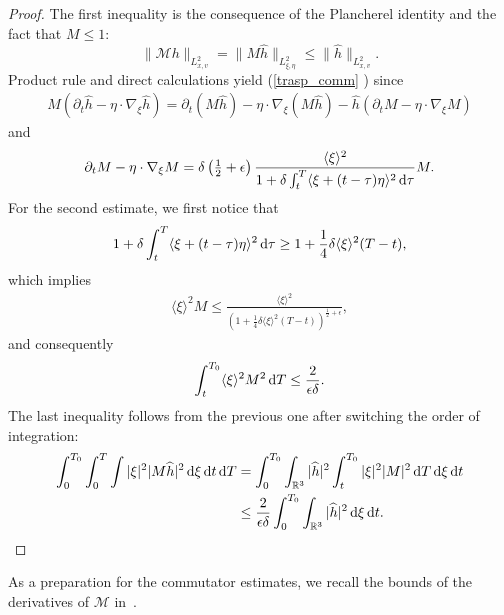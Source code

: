 \documentclass[11pt,american, reqno]{amsart}
\numberwithin{equation}{section}
\newcommand{\R}{\mathbb R}
\newcommand{\1}{\mathds{1}}
\newcommand{\dt}{\, {\rm d} t}
\newcommand{\dT}{\, {\rm d} T}
\newcommand{\CalM}{\mathcal{M}}
\newcommand{\dxi}{\, {\rm d} \xi}
\newcommand{\dtau}{\, {\rm d} \tau}
\newcommand{\Eps}{\epsilon}
\numberwithin{equation}{section}
\begin{document}
\begin{proof} 
The first inequality is the consequence of the Plancherel identity and the fact that $M\le 1$: 
$$
\| \CalM h \|_{L^2_{x,v}} = \| M \hat{h} \|_{L^2_{\xi, \eta}} \le  \| \hat{h} \|_{L^2_{x,v}}. 
$$
Product rule and direct calculations yield (\ref {trasp_comm} ) since 
\begin{align*}
{M} (\partial_t \widehat h   -\eta \cdot \nabla_\xi \widehat  h)  =  \partial_t ({M}\widehat h)  -\eta \cdot \nabla_\xi ({M}\widehat  h)  -\widehat  h( \partial_t {M} -\eta \cdot \nabla_\xi {M})
\end{align*}
and 
\begin{align*}
 \partial_t {M} -\eta \cdot \nabla_\xi {M} = \delta \left(\tfrac{1}{2}+ \Eps\right)\frac{ \langle \xi \rangle^{2}}{1 + \delta \int_t ^T \langle \xi +(t- \tau) \eta\rangle^{2} \dtau} {M}. 
\end{align*}
For the second estimate, we first notice that  
\begin{align*}
 1 + \delta \int_t ^T \langle \xi +(t- \tau) \eta\rangle^{2} \dtau   
\geq  
  1+\frac{1}{4} \delta \langle \xi \rangle ^2 (T-t),
\end{align*}
which implies 
\begin{align*}
 \langle \xi \rangle ^2 {M} 
\le 
  \frac{ \langle \xi \rangle ^2}{ \left( 1+\frac{1}{4} \delta  \langle \xi \rangle ^2 (T-t)\right)^{\frac{1}{2}+\Eps}}, 
\end{align*}
and consequently 
\begin{align*}
 \int_t^{T_0}  \langle \xi \rangle ^2 {M}^2 \dT 
\le   
 \frac{2}{\Eps \delta}. 
\end{align*}
The last inequality follows from the previous one after switching the order of integration:
\begin{align*}
\int_0^{T_0}  \int_0^{T}  \int  |\xi|^2 | {M}\widehat h| ^2 \dxi  \dt \dT & = \int_0^{T_0} \int_{\R^3} |\widehat{h}| ^2  \int_t^{T_0}  |\xi|^2 | {M}| ^2 \dT \dxi  \dt \\
& \le \frac{2}{\Eps \delta} \int_0^{T_0} \int_{\R^3} |\widehat h |^2 \dxi \dt. \qedhere
\end{align*}
\end{proof} 

As a preparation for the commutator estimates, we recall the bounds of the derivatives of $\CalM$ in~\cite{AMSY2020}.
\end{document}
